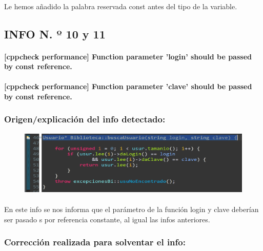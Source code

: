 			\paragraph{}Le hemos añadido la palabra reservada const antes del tipo de la variable.
			
	\subsection{INFO N. º 10 y 11}
	
		\paragraph{[cppcheck performance] Function parameter 'login' should be passed by const reference.}
		
		\paragraph{[cppcheck performance] Function parameter 'clave' should be passed by const reference.}
	
		\subsubsection{Origen/explicación del info detectado:}
		
			\begin{figure}[H]
				\centering
				\includegraphics[scale=0.55]{img/esteban16.png}
				\label{esteban16}
			\end{figure}
		
			\paragraph{}En este info se nos informa que el parámetro de la función login y clave deberían ser pasado s por referencia constante, al igual las infos anteriores.
			
		\subsubsection{Corrección realizada para solventar el info:}
		
